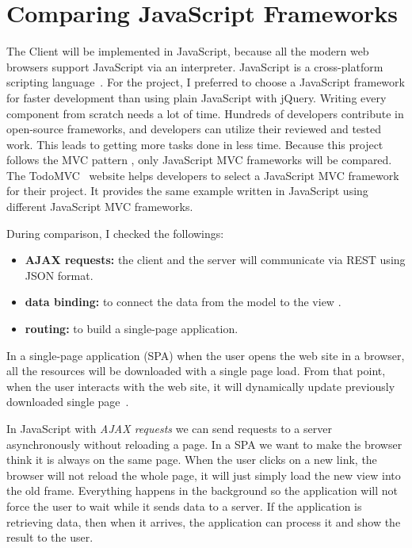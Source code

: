 \chapter{Comparing JavaScript Frameworks}
\label{comparing-frameworks}

The Client will be implemented in JavaScript, because all the modern web browsers support JavaScript via an interpreter. JavaScript is a cross-platform scripting language~\cite{aaf}. For the project, I preferred to choose a JavaScript framework for faster development than using plain JavaScript with jQuery. Writing every component from scratch needs a lot of time. Hundreds of developers contribute in open-source frameworks, and developers can utilize their reviewed and tested work. This leads to getting more tasks done in less time. Because this project follows the MVC pattern , only JavaScript MVC frameworks will be compared. The TodoMVC~\cite{TodoMVC} website helps developers to select a JavaScript MVC framework for their project. It provides the same example written in JavaScript using different JavaScript MVC frameworks.

During comparison, I checked the followings:
\begin{itemize}
	\item \textbf{AJAX requests:} the client and the server  will communicate via REST using JSON format.
	\item \textbf{data binding:} to connect the data from the model to the view .
	\item \textbf{routing:} to build a single-page application.
\end{itemize}


In a single-page application (SPA) when the user opens the web site in a browser, all the resources will be downloaded with a single page load. From that point, when the user interacts with the web site, it will dynamically update previously downloaded single page~\cite{SPA}.

In JavaScript with \emph{AJAX requests} we can send requests to a server asynchronously without reloading a page. In a SPA we want to make the browser think it is always on the same page. When the user clicks on a new link, the browser will not reload the whole page, it will just simply load the new view into the old frame. Everything happens in the background so the application will not force the user to wait while it sends data to a server. If the application is retrieving data, then when it arrives, the application can process it and show the result to the user.

